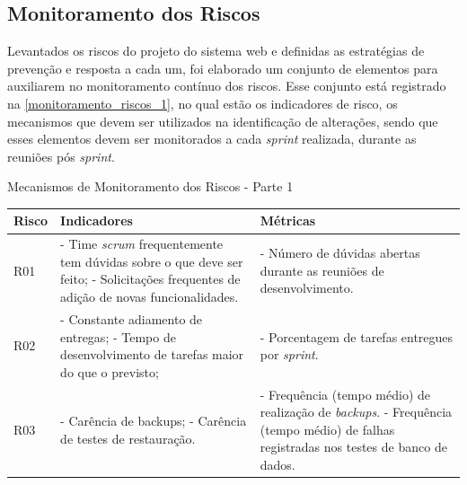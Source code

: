 \documentclass[
	12pt,				%
	openany,			%
	oneside,			%
	a4paper,			%
	english,			%
	french,				%
	spanish,			%
	brazil				%
	]{abntex2}
\begin{document}
\subsection{Monitoramento dos Riscos}
Levantados os riscos do projeto do sistema web e definidas as estratégias de prevenção e resposta a cada um, foi elaborado um conjunto de elementos para auxiliarem no monitoramento contínuo dos riscos. Esse conjunto está registrado na \autoref{monitoramento_riscos_1}, no qual estão os indicadores de risco, os mecanismos que devem ser utilizados na identificação de alterações, sendo que  esses elementos devem ser monitorados a cada \textit{sprint} realizada, durante as reuniões pós \textit{sprint}.
%
 \begin{quadro}[H]
	\caption{Mecanismos de Monitoramento dos Riscos - Parte 1}
	\label{monitoramento_riscos_1} 
	\begin{tabular} {|>{\centering\arraybackslash}m{2.2cm}|p{6cm}|p{6cm}|}
		\hline
		\textbf{Risco} & \textbf{Indicadores} & \textbf{Métricas} \\
		\hline
		R01 & - Time \textit{scrum} frequentemente tem dúvidas sobre o que deve ser feito; \newline
		- Solicitações frequentes de adição de novas funcionalidades.
		& - Número de dúvidas abertas durante as reuniões de desenvolvimento.
		\\	\hline
		R02 & - Constante adiamento de entregas; \newline
		- Tempo de desenvolvimento de tarefas maior do que o previsto;
		& - Porcentagem de tarefas entregues por \textit{sprint}.
		\\	\hline
		R03 & - Carência de backups; \newline
		- Carência de testes de restauração.
		& - Frequência (tempo médio) de realização de \textit{backups}. \newline
		- Frequência (tempo médio) de falhas registradas nos testes de banco de dados.
		\\	\hline
	\end{tabular}
\end{quadro}
\end{document}
